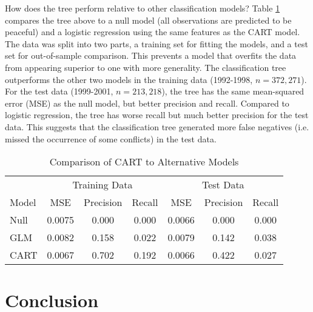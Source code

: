 \documentclass[12pt,letterpaper]{article}
\begin{document}
How does the tree perform relative to other classification models? Table \ref{cart-perf} compares the tree above to a null model (all observations are predicted to be peaceful) and a logistic regression using the same features as the CART model. The data was split into two parts, a training set for fitting the models, and a test set for out-of-sample comparison. This prevents a model that overfits the data from appearing superior to one with more generality. The classification tree outperforms the other two models in the training data (1992-1998, $n=372,271$). For the test data (1999-2001, $n=213,218$), the tree has the same mean-squared error (MSE) as the null model, but better precision and recall. Compared to logistic regression, the tree has worse recall but much better precision for the test data. This suggests that the classification tree generated more false negatives (i.e. missed the occurrence of some conflicts) in the test data.

\begin{table}
	\caption{Comparison of CART to Alternative Models}
	\label{cart-perf}
  \begin{center}
  \begin{tabular}{l|ccc|ccc}
   \multicolumn{1}{c}{} & \multicolumn{3}{c}{Training Data} & \multicolumn{3}{c}{Test Data} \\
  Model & MSE & Precision & Recall & MSE & Precision & Recall \\
  \midrule
  Null & 0.0075 & 0.000 & 0.000 & 0.0066 & 0.000 & 0.000 \\
  GLM & 0.0082 & 0.158 & 0.022  & 0.0079 & 0.142 & 0.038 \\
  CART & 0.0067 & 0.702 & 0.192 & 0.0066 & 0.422 & 0.027 
  \end{tabular}
  \end{center}
\end{table}


\section{Conclusion}
\label{conclusion}



\pagebreak
\singlespacing
\setlength{\bibsep}{0.0pt}


\end{document}
